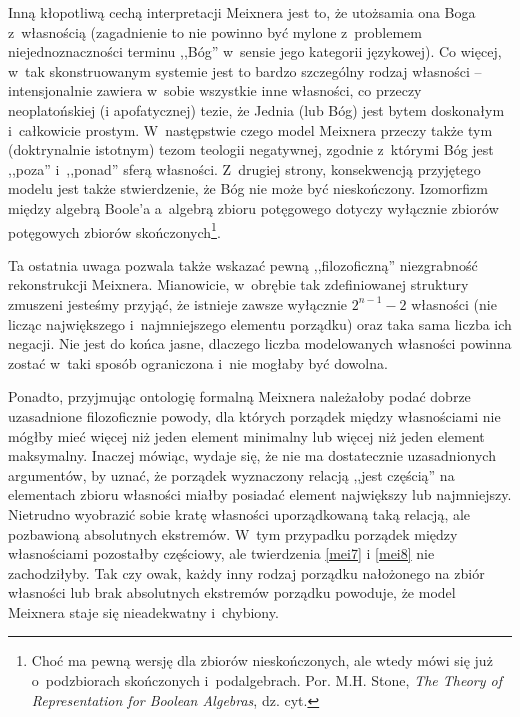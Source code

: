 Inną kłopotliwą cechą interpretacji Meixnera jest to, że utożsamia ona Boga z~własnością (zagadnienie to nie powinno być mylone z~problemem niejednoznaczności terminu ,,Bóg'' w~sensie jego kategorii językowej). Co więcej, w~tak skonstruowanym systemie jest to bardzo szczególny rodzaj własności -- intensjonalnie zawiera w~sobie wszystkie inne własności, co przeczy neoplatońskiej (i apofatycznej) tezie, że Jednia (lub Bóg) jest bytem doskonałym i~całkowicie prostym. W~następstwie czego model Meixnera przeczy także tym (doktrynalnie istotnym) tezom teologii negatywnej, zgodnie z~którymi Bóg jest ,,poza'' i~,,ponad'' sferą własności. Z~drugiej strony, konsekwencją przyjętego modelu jest także stwierdzenie, że Bóg nie może być nieskończony. Izomorfizm między algebrą Boole'a a~algebrą zbioru potęgowego dotyczy wyłącznie zbiorów potęgowych zbiorów skończonych\footnote{Choć ma pewną wersję dla zbiorów nieskończonych, ale wtedy mówi się już o~podzbiorach skończonych i~podalgebrach. Por. M.H. Stone, \textit{The Theory of Representation for Boolean Algebras}, dz. cyt.}.

Ta ostatnia uwaga pozwala także wskazać pewną ,,filozoficzną'' niezgrabność rekonstrukcji Meixnera. Mianowicie, w~obrębie tak zdefiniowanej struktury zmuszeni jesteśmy przyjąć, że istnieje zawsze wyłącznie $2^{n-1}-2$ własności (nie licząc największego i~najmniejszego elementu porządku) oraz taka sama liczba ich negacji. Nie jest do końca jasne, dlaczego liczba modelowanych własności powinna zostać w~taki sposób ograniczona i~nie mogłaby być dowolna.

Ponadto, przyjmując ontologię formalną Meixnera należałoby podać dobrze uzasadnione filozoficznie powody, dla których porządek między własnościami nie mógłby mieć więcej niż jeden element minimalny lub więcej niż jeden element maksymalny. Inaczej mówiąc, wydaje się, że nie ma dostatecznie uzasadnionych argumentów, by uznać, że porządek wyznaczony relacją ,,jest częścią'' na elementach zbioru własności miałby posiadać element największy lub najmniejszy. Nietrudno wyobrazić sobie kratę własności uporządkowaną taką relacją, ale pozbawioną absolutnych ekstremów. W~tym przypadku porządek między własnościami pozostałby częściowy, ale twierdzenia \eqref{mei7} i \eqref{mei8} nie zachodziłyby. Tak czy owak, każdy inny rodzaj porządku nałożonego na zbiór własności lub brak absolutnych ekstremów porządku powoduje, że model Meixnera staje się nieadekwatny i~chybiony.

